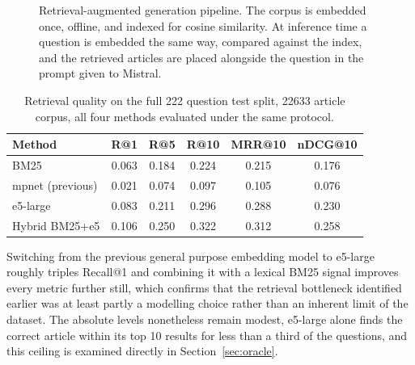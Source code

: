 \documentclass[11pt, a4paper]{article}
\begin{document}
\begin{figure}[t]
\centering
{}
\caption{Retrieval-augmented generation pipeline. The corpus is embedded once, offline, and indexed for cosine similarity. At inference time a question is embedded the same way, compared against the index, and the retrieved articles are placed alongside the question in the prompt given to Mistral.}
\label{fig:ragdiagram}
\end{figure}

\begin{table}[t]
\centering
\begin{tabular}{lccccc}
\toprule
\textbf{Method} & \textbf{R@1} & \textbf{R@5} & \textbf{R@10} & \textbf{MRR@10} & \textbf{nDCG@10} \\
\midrule
BM25 & 0.063 & 0.184 & 0.224 & 0.215 & 0.176 \\
mpnet (previous) & 0.021 & 0.074 & 0.097 & 0.105 & 0.076 \\
e5-large & 0.083 & 0.211 & 0.296 & 0.288 & 0.230 \\
Hybrid BM25+e5 & 0.106 & 0.250 & 0.322 & 0.312 & 0.258 \\
\bottomrule
\end{tabular}
\caption{Retrieval quality on the full 222 question test split, 22633 article corpus, all four methods evaluated under the same protocol.}
\label{tab:retrieval}
\end{table}

Switching from the previous general purpose embedding model to e5-large roughly triples Recall@1 and combining it with a lexical BM25 signal improves every metric further still, which confirms that the retrieval bottleneck identified earlier was at least partly a modelling choice rather than an inherent limit of the dataset. The absolute levels nonetheless remain modest, e5-large alone finds the correct article within its top 10 results for less than a third of the questions, and this ceiling is examined directly in Section~\ref{sec:oracle}.
\end{document}
